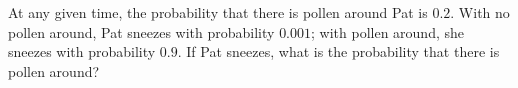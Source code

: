 At any given time, the probability that there is pollen around Pat is $0.2$. With no pollen around, Pat sneezes with probability $0.001$; with pollen around, she sneezes with probability $0.9$. If Pat sneezes, what is the probability that there is pollen around?
